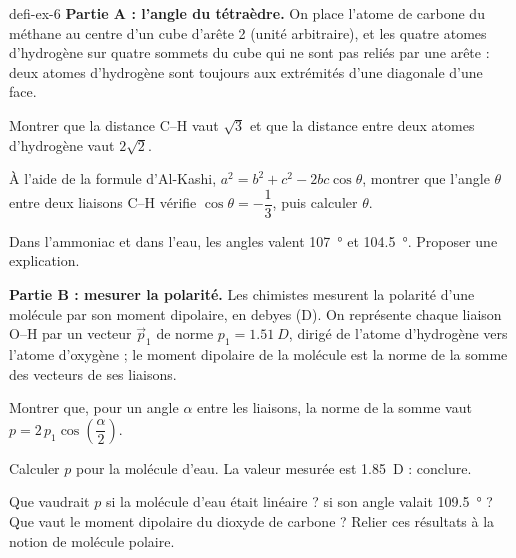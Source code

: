 \begin{blocEdition}{defi-ex-6}
\textbf{Partie A : l'angle du tétraèdre.} On place l'atome de carbone du méthane au centre d'un cube d'arête 2 (unité
arbitraire), et les quatre atomes d'hydrogène sur quatre sommets du cube qui ne sont pas reliés par une arête : deux
atomes d'hydrogène sont toujours aux extrémités d'une diagonale d'une face.
\begin{questions}
\item Montrer que la distance C--H vaut $\sqrt3$ et que la distance entre deux atomes d'hydrogène vaut $2\sqrt2$.
\item À l'aide de la formule d'Al-Kashi, $a^2=b^2+c^2-2bc\cos\theta$, montrer que l'angle $\theta$ entre deux liaisons C--H vérifie
$\cos\theta=-\dfrac13$, puis calculer $\theta$.
\item Dans l'ammoniac et dans l'eau, les angles valent \qty{107}{\degree} et \qty{104,5}{\degree}. Proposer une explication.
\end{questions}
\textbf{Partie B : mesurer la polarité.} Les chimistes mesurent la polarité d'une molécule par son moment dipolaire, en
debyes (D). On représente chaque liaison O--H par un vecteur $\vec p_1$ de norme $p_1=\qty{1,51}{D}$, dirigé de l'atome d'hydrogène
vers l'atome d'oxygène ; le moment dipolaire de la molécule est la norme de la somme des vecteurs de ses liaisons.
\begin{questions}[resume]
\item Montrer que, pour un angle $\alpha$ entre les liaisons, la norme de la somme vaut $p=2\,p_1\cos\left(\dfrac{\alpha}{2}\right)$.
\item Calculer $p$ pour la molécule d'eau. La valeur mesurée est \qty{1,85}{D} : conclure.
\item Que vaudrait $p$ si la molécule d'eau était linéaire ? si son angle valait \qty{109,5}{\degree} ? Que vaut le moment dipolaire du
dioxyde de carbone ? Relier ces résultats à la notion de molécule polaire.
\end{questions}
\end{blocEdition}

